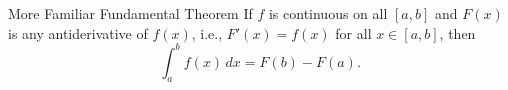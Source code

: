 
\begin{thm}{More Familiar Fundamental Theorem}{}
	If \(f\) is continuous on all \([a, b]\) and \(F(x)\) is any antiderivative of \(f(x)\), i.e., \(F'(x) = f(x)\) for all \(x \in [a, b]\), then \[
		\int_a^b f(x)\,dx = F(b) - F(a).
	\] 
\end{thm}
